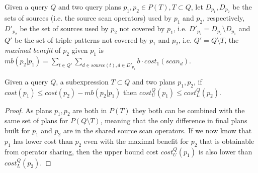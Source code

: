 %

  
  
\begin{definition}
  Given a query $Q$ and two query plans $p_1,p_2 \in P(T), T \subset
  Q$, let $D_{p_1},D_{p_2}$ be the sets of sources (i.e. the source
  scan operators) used by $p_1$ and $p_2$, respectively, $D'_{p_2}$ be
  the set of sources used by $p_2$ not covered by $p_1$,
  i.e. $D'_{p_2} = D_{p_2} \setminus D_{p_1}$ and $Q'$ be the set of
  triple patterns not covered by $p_1$ and $p_2$, i.e. $Q' = Q
  \setminus T$, the \emph{maximal benefit} of $p_2$ given $p_1$ is
  $mb(p_2|p_1) = \sum_{t \in Q'} \sum_{d \in source(t), d \in D'_{p_2}
  } b \cdot cost_1(scan_d)$.
\end{definition}

\begin{lemma}
  \label{def:estimated_bound}
  Given a query $Q$, a subexpression $T \subset Q$ and two plans
  $p_1,p_2$, if $cost(p_1) \leq cost(p_2) - mb(p_2|p_1)$ then
  $cost_U^Q(p_1) \leq cost_L^Q(p_2)$.
\end{lemma}
\begin{proof}
  As plans $p_1,p_2$ are both in $P(T)$ they both can be combined with
  the same set of plans for $P(Q \setminus T)$, meaning that the only
  difference in final plans built for $p_1$ and $p_2$ are in the
  shared source scan operators. If we now know that $p_1$ has lower
  cost than $p_2$ even with the maximal benefit for $p_2$ that is
  obtainable from operator sharing, then the upper bound cost
  $cost_U^Q(p_1)$ is also lower than $cost_L^Q(p_2)$.
\end{proof}

